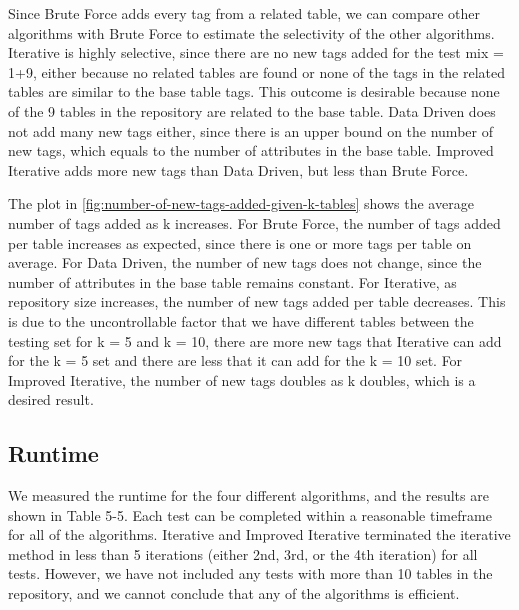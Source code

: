 Since Brute Force adds every tag from a related table, we can compare other algorithms with Brute Force to estimate the selectivity of the other algorithms. Iterative is highly selective, since there are no new tags added for the test mix = 1+9, either because no related tables are found or none of the tags in the related tables are similar to the base table tags. This outcome is desirable because none of the 9 tables in the repository are related to the base table. Data Driven does not add many new tags either, since there is an upper bound on the number of new tags, which equals to the number of attributes in the base table. Improved Iterative adds more new tags than Data Driven, but less than Brute Force.

The plot in \autoref{fig:number-of-new-tags-added-given-k-tables} shows the average number of tags added as k increases. For Brute Force, the number of tags added per table increases as expected, since there is one or more tags per table on average. For Data Driven, the number of new tags does not change, since the number of attributes in the base table remains constant. For Iterative, as repository size increases, the number of new tags added per table decreases. This is due to the uncontrollable factor that we have different tables between the testing set for k = 5 and k = 10, there are more new tags that Iterative can add for the k = 5 set and there are less that it can add for the k = 10 set. For Improved Iterative, the number of new tags doubles as k doubles, which is a desired result.

\subsection{Runtime}

We measured the runtime for the four different algorithms, and the results are shown in Table 5-5. Each test can be completed within a reasonable timeframe for all of the algorithms. Iterative and Improved Iterative terminated the iterative method in less than 5 iterations (either 2nd, 3rd, or the 4th iteration) for all tests. However, we have not included any tests with more than 10 tables in the repository, and we cannot conclude that any of the algorithms is efficient.

